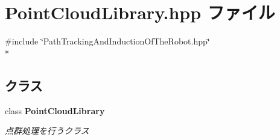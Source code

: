 \section{Point\-Cloud\-Library.\-hpp ファイル}
\label{_point_cloud_library_8hpp}
{\ttfamily \#include \char`\"{}Path\-Tracking\-And\-Induction\-Of\-The\-Robot.\-hpp\char`\"{}}\\*
\subsection*{クラス}
\begin{DoxyCompactItemize}
\item 
class {\bf Point\-Cloud\-Library}
\begin{DoxyCompactList}\small\item\em 点群処理を行うクラス \end{DoxyCompactList}\end{DoxyCompactItemize}
